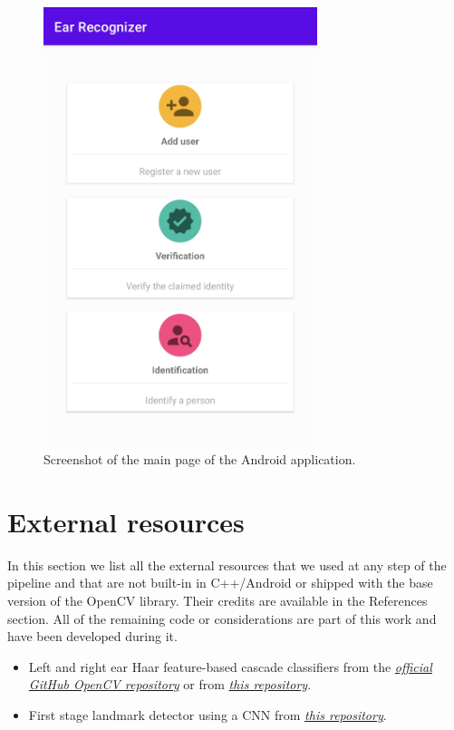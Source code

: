 \documentclass{article}
\begin{document}
\begin{figure}[H]
    \label{fig:det}
    \begin{center}
        \includegraphics[width=8cm,keepaspectratio]{images/screen_android.jpeg}
        \caption{Screenshot of the main page of the Android application.}
    \end{center}
\end{figure}

\section{External resources}

In this section we list all the external resources that we used at any step of the pipeline and that are not
built-in in C++/Android or shipped with the base version of the OpenCV library. Their credits are available in
the References section. All of the remaining code or considerations are part of this work and have been
developed during it.

\begin{itemize}
    \item Left and right ear Haar feature-based cascade classifiers from
        the
        \href{https://github.com/opencv/opencv/tree/e33bfb5ebfcf51b5f15995c08fd68a6b2ecb2f1e/data/haarcascades}{\emph{official GitHub OpenCV repository}}
        or from
        \href{https://github.com/DiUS/Physiognomy/tree/master/python/haarcascades}{\emph{this repository}}.
    \item First stage landmark detector using a CNN from
        \href{https://github.com/maups/ear-recognition}{\emph{this repository}}.
\end{itemize}
\end{document}
